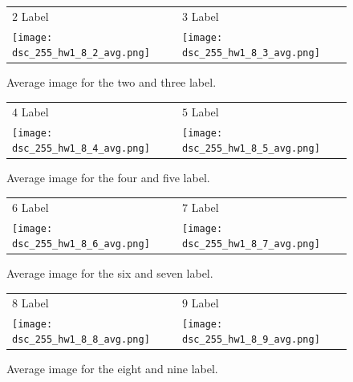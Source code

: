 \documentclass{article}
\begin{document}
\begin{figure}[htbp]
\centering
\begin{tabular}{>{\centering\arraybackslash}p{} >{\centering\arraybackslash}p{}}
$2$ Label & $3$ Label \\
\texttt{[image: dsc\_255\_hw1\_8\_2\_avg.png]} & \texttt{[image: dsc\_255\_hw1\_8\_3\_avg.png]} \\
\end{tabular}
\caption{Average image for the two and three label.}
\label{fig:image_comparison}
\end{figure}

\begin{figure}[htbp]
\centering
\begin{tabular}{>{\centering\arraybackslash}p{} >{\centering\arraybackslash}p{}}
$4$ Label & $5$ Label \\
\texttt{[image: dsc\_255\_hw1\_8\_4\_avg.png]} & \texttt{[image: dsc\_255\_hw1\_8\_5\_avg.png]} \\
\end{tabular}
\caption{Average image for the four and five label.}
\label{fig:image_comparison}
\end{figure}

\begin{figure}[htbp]
\centering
\begin{tabular}{>{\centering\arraybackslash}p{} >{\centering\arraybackslash}p{}}
$6$ Label & $7$ Label \\
\texttt{[image: dsc\_255\_hw1\_8\_6\_avg.png]} & \texttt{[image: dsc\_255\_hw1\_8\_7\_avg.png]} \\
\end{tabular}
\caption{Average image for the six and seven label.}
\label{fig:image_comparison}
\end{figure}

\begin{figure}[htbp]
\centering
\begin{tabular}{>{\centering\arraybackslash}p{} >{\centering\arraybackslash}p{}}
$8$ Label & $9$ Label \\
\texttt{[image: dsc\_255\_hw1\_8\_8\_avg.png]} & \texttt{[image: dsc\_255\_hw1\_8\_9\_avg.png]} \\
\end{tabular}
\caption{Average image for the eight and nine label.}
\label{fig:image_comparison}
\end{figure}
\end{document}
